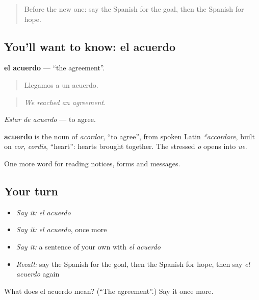 \begin{quote}
Before the new one: say the Spanish for the goal, then the Spanish for hope.
\end{quote}

\subsection*{You'll want to know: el acuerdo}
\textbf{el acuerdo} — \textquotedblleft{}the agreement\textquotedblright{}.

\begin{quote}
Llegamos a un acuerdo.
\end{quote}

\begin{quote}
\emph{We reached an agreement.}
\end{quote}

\emph{Estar de acuerdo} — to agree.

\begin{cousinweb}
\textbf{acuerdo} is the noun of \emph{acordar}, \textquotedblleft{}to agree\textquotedblright{}, from spoken Latin \emph{*accordare}, built on \emph{cor}, \emph{cordis}, \textquotedblleft{}heart\textquotedblright{}: hearts brought together. The stressed \emph{o} opens into \emph{ue}.
\end{cousinweb}

\begin{grammarlens}[title={What you've built}]
One more word for reading notices, forms and messages.
\end{grammarlens}

\subsection*{Your turn}
\begin{itemize}
\raggedright
  \item \emph{Say it:} \emph{el acuerdo}
  \item \emph{Say it:} \emph{el acuerdo}, once more
  \item \emph{Say it:} a sentence of your own with \emph{el acuerdo}
  \item \emph{Recall:} say the Spanish for the goal, then the Spanish for hope, then say \emph{el acuerdo} again
\end{itemize}

\begin{tcolorbox}[breakable,colback=teal!4,colframe=teal!35!black,title={Before you move on}]
What does el acuerdo mean? (\textquotedblleft{}The agreement\textquotedblright{}.) Say it once more.
\end{tcolorbox}
